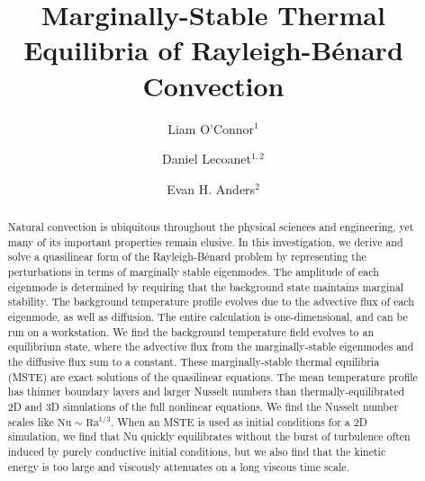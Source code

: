 \documentclass[reprint,amsmath,amssymb,aps,nofootinbib]{revtex4-1}
\newcommand\Ra{\mathrm{Ra}}
\newcommand\Nu{\mathrm{Nu}}
\begin{document}
\title{Marginally-Stable Thermal Equilibria of Rayleigh-Bénard Convection}

\author{Liam O'Connor$^1$}
\author{Daniel Lecoanet$^{1, 2}$}
\author{Evan H. Anders$^2$}

\begin{abstract}
    Natural convection is ubiquitous throughout the physical sciences and engineering, yet many of its important properties remain elusive.
    In this investigation, we derive and solve a quasilinear form of the Rayleigh-Bénard problem by representing the perturbations in terms of marginally stable eigenmodes.
    The amplitude of each eigenmode is determined by requiring that the background state maintains marginal stability.
    The background temperature profile evolves due to the advective flux of each eigenmode, as well as diffusion.
    The entire calculation is one-dimensional, and can be run on a workstation.
    We find the background temperature field evolves to an equilibrium state, where the advective flux from the marginally-stable eigenmodes and the diffusive flux sum to a constant.
    These marginally-stable thermal equilibria (MSTE) are exact solutions of the quasilinear equations.
    The mean temperature profile has thinner boundary layers and larger Nusselt numbers than thermally-equilibrated 2D and 3D simulations of the full nonlinear equations.
    We find the Nusselt number scales like $\Nu \sim\Ra^{1/3}$.
    When an MSTE is used as initial conditions for a 2D simulation, we find that Nu quickly equilibrates without the burst of turbulence often induced by purely conductive initial conditions, but we also find that the kinetic energy is too large and viscously attenuates on a long viscous time scale.
\end{abstract}

\maketitle
\end{document}
